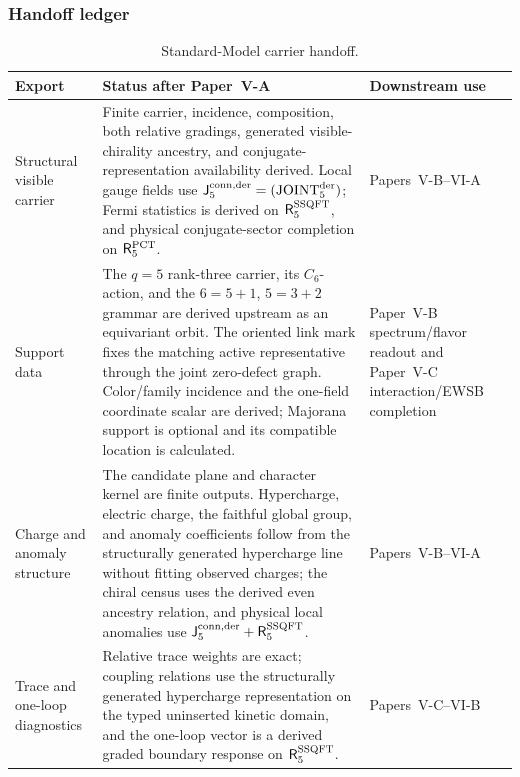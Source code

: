 \documentclass[12pt,a4paper]{article}
\begin{document}
\subsubsection{Handoff ledger}
\begin{table}[H]
\centering
\caption[Standard-Model carrier handoff]{Standard-Model carrier handoff.}
\label{p5:tab:standard-model-carrier-handoff}
\footnotesize
\renewcommand{\arraystretch}{1.15}
\begin{tabularx}{\textwidth}{>{\raggedright\arraybackslash}p{}
                                >{\raggedright\arraybackslash}X
                                >{\raggedright\arraybackslash}p{}}
\toprule
\textbf{Export} & \textbf{Status after Paper~V-A} & \textbf{Downstream use} \\
\midrule
Structural visible carrier & Finite carrier, incidence, composition, both
relative gradings, generated visible-chirality ancestry, and
conjugate-representation availability derived.  Local gauge fields use
\(\mathsf J_5^{\rm conn,der}=({\rm JOINT}_5^{\rm der})\); Fermi statistics is
derived on \(\mathsf R_5^{\rm SSQFT}\), and physical conjugate-sector
completion on \(\mathsf R_5^{\rm PCT}\). & Papers~V-B--VI-A \\
Support data & The \(q=5\) rank-three carrier, its \(C_6\)-action, and the
\(6=5+1\), \(5=3+2\) grammar are derived upstream as an equivariant orbit.
The oriented link mark fixes the matching active representative through the
joint zero-defect graph.  Color/family incidence and the one-field
coordinate scalar are derived; Majorana support is optional and its compatible
location is calculated. & Paper~V-B spectrum/flavor readout and
Paper~V-C interaction/EWSB completion \\
Charge and anomaly structure & The candidate plane and character kernel are
finite outputs.  Hypercharge, electric charge, the faithful global group, and
anomaly coefficients follow from the structurally generated hypercharge line
without fitting observed charges; the chiral census uses the derived even ancestry relation, and physical local
anomalies use \(\mathsf J_5^{\rm conn,der}+\mathsf R_5^{\rm SSQFT}\). & Papers~V-B--VI-A \\
Trace and one-loop diagnostics & Relative trace weights are exact; coupling
relations use the structurally generated hypercharge representation on the
typed uninserted kinetic domain, and the one-loop vector is a derived graded boundary response on
\(\mathsf R_5^{\rm SSQFT}\). &
Papers~V-C--VI-B \\

\end{tabularx}
\end{table}
\end{document}

